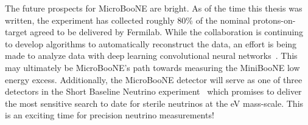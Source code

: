 The future prospects for MicroBooNE are bright. As of the time this thesis was written, the experiment has collected roughly 80\% of the nominal protons-on-target agreed to be delivered by Fermilab. While the collaboration is continuing to develop algorithms to automatically reconstruct the data, an effort is being made to analyze data with deep learning convolutional neural networks~\cite{UBCNNsource}. This may ultimately be MicroBooNE's path towards measuring the MiniBooNE low energy excess. Additionally, the MicroBooNE detector will serve as one of three detectors in the Short Baseline Neutrino experiment~\cite{SBNproposal} which promises to deliver the most sensitive search to date for sterile neutrinos at the eV mass-scale. This is an exciting time for precision neutrino measurements!